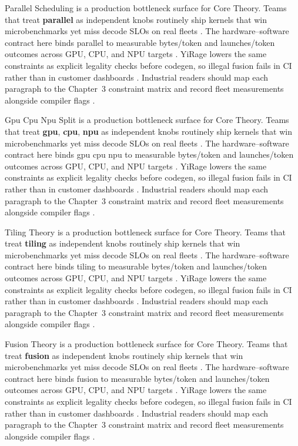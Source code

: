 Parallel Scheduling is a production bottleneck surface for Core Theory. Teams that treat \textbf{parallel} as independent knobs routinely ship kernels that win microbenchmarks yet miss decode SLOs on real fleets \citep{nvidia2024cudagraphs,taxbreak2026}. The hardware--software contract here binds parallel to measurable bytes/token and launches/token outcomes across GPU, CPU, and NPU targets \citep{liu2024deepseekv3,memoryfloor2026}. YiRage lowers the same constraints as explicit legality checks before codegen, so illegal fusion fails in CI rather than in customer dashboards \citep{patel2025llminference,nvidia2022hopper}. Industrial readers should map each paragraph to the Chapter~3 constraint matrix and record fleet measurements alongside compiler flags \citep{taxbreak2026,semianalysis2024tma}.

Gpu Cpu Npu Split is a production bottleneck surface for Core Theory. Teams that treat \textbf{gpu}, \textbf{cpu}, \textbf{npu} as independent knobs routinely ship kernels that win microbenchmarks yet miss decode SLOs on real fleets \citep{liu2024deepseekv3,memoryfloor2026}. The hardware--software contract here binds gpu cpu npu to measurable bytes/token and launches/token outcomes across GPU, CPU, and NPU targets \citep{patel2025llminference,nvidia2022hopper}. YiRage lowers the same constraints as explicit legality checks before codegen, so illegal fusion fails in CI rather than in customer dashboards \citep{taxbreak2026,semianalysis2024tma}. Industrial readers should map each paragraph to the Chapter~3 constraint matrix and record fleet measurements alongside compiler flags \citep{memoryfloor2026,amd2024xdna}.

Tiling Theory is a production bottleneck surface for Core Theory. Teams that treat \textbf{tiling} as independent knobs routinely ship kernels that win microbenchmarks yet miss decode SLOs on real fleets \citep{patel2025llminference,nvidia2022hopper}. The hardware--software contract here binds tiling to measurable bytes/token and launches/token outcomes across GPU, CPU, and NPU targets \citep{taxbreak2026,semianalysis2024tma}. YiRage lowers the same constraints as explicit legality checks before codegen, so illegal fusion fails in CI rather than in customer dashboards \citep{memoryfloor2026,amd2024xdna}. Industrial readers should map each paragraph to the Chapter~3 constraint matrix and record fleet measurements alongside compiler flags \citep{nvidia2022hopper,amd2024aie}.

Fusion Theory is a production bottleneck surface for Core Theory. Teams that treat \textbf{fusion} as independent knobs routinely ship kernels that win microbenchmarks yet miss decode SLOs on real fleets \citep{taxbreak2026,semianalysis2024tma}. The hardware--software contract here binds fusion to measurable bytes/token and launches/token outcomes across GPU, CPU, and NPU targets \citep{memoryfloor2026,amd2024xdna}. YiRage lowers the same constraints as explicit legality checks before codegen, so illegal fusion fails in CI rather than in customer dashboards \citep{nvidia2022hopper,amd2024aie}. Industrial readers should map each paragraph to the Chapter~3 constraint matrix and record fleet measurements alongside compiler flags \citep{semianalysis2024tma,dlbook}.

